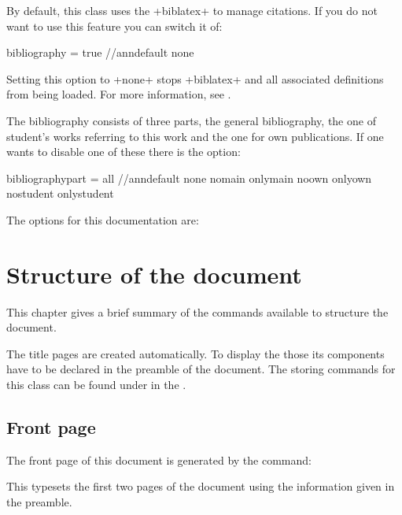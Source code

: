 \documentclass[
  paper = 17x24, %
  language = english, %
  acronym = true, %
  bibliography = true, %
  acronymline = onlyhorizontal, %
]{faupress}
\begin{document}
By default, this class uses the \code+biblatex+ to manage citations. If you do not want to
use this feature you can switch it of:
\begin{codebox}
  bibliography = true //ann{default}
                 none
\end{codebox}
Setting this option to \code+none+ stops \code+biblatex+ and all associated definitions
from being loaded. For more information, see .

The bibliography consists of three parts, the general bibliography, the one of
student's works referring to this work and the one for own publications. If one
wants to disable one of these there is the option:
\begin{codebox}
  bibliographypart = all //ann{default}
                     none
                     nomain
                     onlymain
                     noown
                     onlyown
                     nostudent
                     onlystudent
\end{codebox}

The options for this documentation are:

\chapter{Structure of the document}

This chapter gives a brief summary of the commands available to structure the
document.

The title pages are created automatically. To display the those its components have to be
declared in the preamble of the document. The storing commands for this class can be found
under  in the .

\section{Front page}
The front page of this document is generated by the command:
\begin{codebox}[custom]
  \maketitle
\end{codebox}
This typesets the first two pages of the document using the information given in the
preamble.
\end{document}
